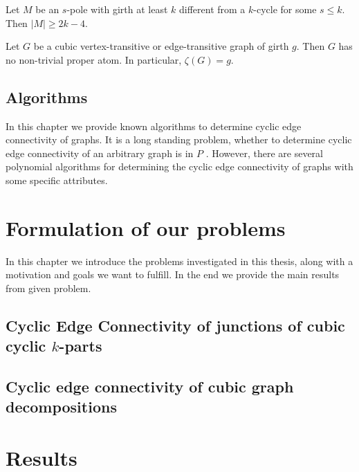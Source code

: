 \documentclass[12pt, twoside]{book}
\begin{document}
\begin{lemma}\label{lem:rajnik5.1}
	Let $M$ be an $s$-pole with girth at least $k$ different from a $k$-cycle for some $s\leq k$. Then $|M| \geq 2k - 4$.
\end{lemma}

\begin{theorem}\label{th:cyclic-connectivity-of-transitive}
	Let $G$ be a cubic vertex-transitive or edge-transitive graph of girth $g$. Then $G$ has no non-trivial proper atom. In particular, $\zeta(G) = g$.
\end{theorem}

\section{Algorithms}\label{sec:algorithms}

In this chapter we provide known algorithms to determine cyclic edge connectivity of graphs. It is a long standing problem, whether to determine cyclic edge connectivity of an arbitrary graph is in $P$ . However, there are several polynomial algorithms for determining the cyclic edge connectivity of graphs with some specific attributes.

\chapter{Formulation of our problems}\label{ch:problem-formulation}

In this chapter we introduce the problems investigated in this thesis, along with a motivation and goals we want to fulfill. In the end we provide the main results from given problem.

\section{Cyclic Edge Connectivity of junctions of cubic cyclic $k$-parts}

\section{Cyclic edge connectivity of cubic graph decompositions}


\chapter{Results}\label{ch:results}
\end{document}
